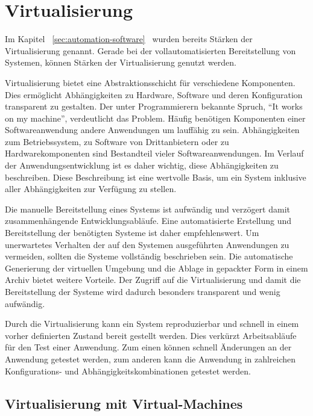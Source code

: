 \section{Virtualisierung}

Im Kapitel ~\ref{sec:automation-software}~ wurden bereits Stärken der Virtualisierung 
genannt. Gerade bei der vollautomatisierten Bereitstellung von Systemen, können Stärken der Virtualisierung genutzt werden.

Virtualisierung bietet eine Abstraktionsschicht für verschiedene Komponenten. Dies ermöglicht Abhängigkeiten zu Hardware, 
Software und deren Konfiguration transparent zu gestalten. Der unter Programmierern bekannte Spruch, ``It works on my 
machine'', verdeutlicht das Problem. Häufig benötigen Komponenten einer Softwareanwendung andere Anwendungen um lauffähig 
zu sein. Abhängigkeiten zum Betriebssystem, zu Software von Drittanbietern oder zu Hardwarekomponenten sind Bestandteil 
vieler Softwareanwendungen. Im Verlauf der Anwendungsentwicklung ist es daher wichtig, diese Abhängigkeiten zu 
beschreiben. Diese Beschreibung ist eine wertvolle Basis, um ein System inklusive aller Abhängigkeiten zur Verfügung zu stellen.

Die manuelle Bereitstellung eines Systems ist aufwändig und verzögert damit zusammenhängende Entwicklungsabläufe. Eine 
automatisierte Erstellung und Bereitstellung der benötigten Systeme ist daher empfehlenswert. Um unerwartetes Verhalten 
der auf den Systemen ausgeführten Anwendungen zu vermeiden, sollten die Systeme vollständig beschrieben sein. Die 
automatische Generierung der virtuellen Umgebung und die Ablage in gepackter Form in einem Archiv bietet weitere 
Vorteile. Der Zugriff auf die Virtualisierung und damit die Bereitstellung der Systeme wird dadurch besonders transparent 
und wenig aufwändig.

Durch die Virtualisierung kann ein System reproduzierbar und schnell in einem vorher definierten Zustand bereit gestellt werden. Dies verkürzt Arbeitsabläufe für den Test einer Anwendung. Zum einen können schnell Änderungen an der Anwendung getestet werden, zum anderen kann die Anwendung in zahlreichen Konfigurations- und Abhängigkeitskombinationen getestet werden.

\subsection{Virtualisierung mit Virtual-Machines}

